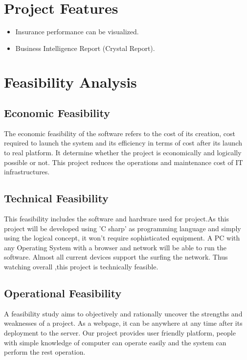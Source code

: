 \section{Project Features} \label{sec:feat}
\begin{itemize}
\item Insurance performance can be visualized. 
\item Business Intelligence Report (Crystal Report). 
\end{itemize}






\section{Feasibility Analysis}

\subsection{Economic Feasibility}

The economic feasibility of the software refers to the cost of its creation, cost required
to launch the system and its efficiency in terms of cost after its launch to real platform.
It determine whether the project is economically and logically possible or not.  This
project reduces the operations and maintenance cost of IT infrastructures.

\subsection{Technical Feasibility}
This feasibility includes the software and hardware used for project.As this project will be developed using 'C sharp' as programming language and simply using the logical concept, it won't require sophisticated equipment. A PC with any Operating System with a browser and network will be able to run the software. Almost all current devices support the surfing the network. Thus watching overall ,this project is technically feasible.

\subsection{Operational Feasibility}
A feasibility study aims to objectively and rationally uncover the strengths and weaknesses of a project. As a webpage, it can be anywhere at any time after its deployment to the server. Our project provides user friendly platform, people with simple knowledge of computer can operate easily and the system can perform the rest operation.

